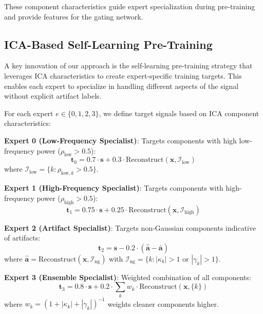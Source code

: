 \documentclass{article}
\begin{document}
These component characteristics guide expert specialization during pre-training and provide features for the gating network.

\subsection{ICA-Based Self-Learning Pre-Training}

A key innovation of our approach is the self-learning pre-training strategy that leverages ICA characteristics to create expert-specific training targets. This enables each expert to specialize in handling different aspects of the signal without explicit artifact labels.

For each expert $e \in \{0, 1, 2, 3\}$, we define target signals based on ICA component characteristics:

\textbf{Expert 0 (Low-Frequency Specialist)}: Targets components with high low-frequency power ($\rho_{\text{low}} > 0.5$):
\begin{equation}
\mathbf{t}_0 = 0.7 \cdot \mathbf{s} + 0.3 \cdot \text{Reconstruct}(\mathbf{x}, \mathcal{I}_{\text{low}})
\end{equation}
where $\mathcal{I}_{\text{low}} = \{k : \rho_{\text{low},k} > 0.5\}$.

\textbf{Expert 1 (High-Frequency Specialist)}: Targets components with high-frequency power ($\rho_{\text{high}} > 0.5$):
\begin{equation}
\mathbf{t}_1 = 0.75 \cdot \mathbf{s} + 0.25 \cdot \text{Reconstruct}(\mathbf{x}, \mathcal{I}_{\text{high}})
\end{equation}

\textbf{Expert 2 (Artifact Specialist)}: Targets non-Gaussian components indicative of artifacts:
\begin{equation}
\mathbf{t}_2 = \mathbf{s} - 0.2 \cdot (\hat{\mathbf{a}} - \bar{\mathbf{a}})
\end{equation}
where $\hat{\mathbf{a}} = \text{Reconstruct}(\mathbf{x}, \mathcal{I}_{\text{ng}})$ with $\mathcal{I}_{\text{ng}} = \{k : |\kappa_k| > 1 \text{ or } |\gamma_k| > 1\}$.

\textbf{Expert 3 (Ensemble Specialist)}: Weighted combination of all components:
\begin{equation}
\mathbf{t}_3 = 0.8 \cdot \mathbf{s} + 0.2 \cdot \sum_k w_k \cdot \text{Reconstruct}(\mathbf{x}, \{k\})
\end{equation}
where $w_k = (1 + |\kappa_k| + |\gamma_k|)^{-1}$ weights cleaner components higher.
\end{document}
